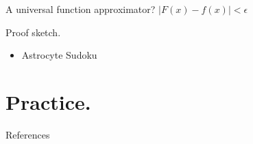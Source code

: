 \documentclass[10pt]{beamer}
\begin{document}
\begin{frame}[fragile]{A universal function approximator?}
$|F(x) - f(x)| < \epsilon$
\end{frame}

\begin{frame}[fragile]{Proof sketch.}
\begin{itemize}
\item Astrocyte Sudoku
\end{itemize}
\end{frame}

\section[In practice.]{Practice.}
 

\begin{frame}[allowframebreaks]{References}
  
  
\end{frame}

\end{document}
